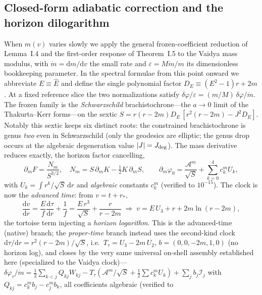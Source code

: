 \documentclass[12pt]{iopart}
\newcommand{\Ehat}{\hat E}
\newcommand{\dd}{\mathrm{d}}
\begin{document}
\subsection{Closed-form adiabatic correction and the horizon dilogarithm}
\label{sec:vaidya-adiabatic}
When $m(v)$ varies slowly we apply the general frozen-coefficient reduction of
Lemma~I.4 and the first-order response of Theorem~I.5 to the Vaidya mass modulus, with
$\dot m=\dd m/\dd v$ the small rate and $\varepsilon=M\dot m/m$ its dimensionless
bookkeeping parameter. In the spectral formulae from this point onward we abbreviate
$E\equiv\Ehat$ and define the single polynomial factor
$D_E\equiv(E^2-1)r+2m$. At a fixed reference slice the two normalizations satisfy
$\delta\varphi/\varepsilon=(m/M)\,\delta\varphi/\dot m$. The frozen family
is the \emph{Schwarzschild} brachistochrone---the $a\to0$ limit of the
Thakurta--Kerr forms---on the sextic
$S=r(r-2m)D_E\,[r^2(r-2m)-J^2 D_E]$. Notably this sextic keeps six
distinct roots: the constrained brachistochrone is genus \emph{two} even in
Schwarzschild (only the geodesics are elliptic; the genus drop occurs at the algebraic
degeneration value $|J|=J_{\rm deg}$). The mass derivative reduces exactly, the horizon factor cancelling,
\begin{equation}
    \partial_m F=\frac{N_m}{S^{3/2}},\quad N_m=S\,\partial_m K-\tfrac12 K\,\partial_m S,
    \qquad
    \partial_m\varphi_0=\frac{\mathcal{A}^m}{\sqrt S}+\sum_{k=0}^4 c_k^m U_k,
    \label{eq:dm-reduction}
\end{equation}
with $U_k=\int r^k/\sqrt S\,\dd r$ and \emph{algebraic} constants $c_k^m$ (verified
to $10^{-15}$). The clock is now the \emph{advanced time}: from $v=t+r_*$,
\begin{equation}
    \frac{\dd v}{\dd r}=\frac{E}{f}\frac{\dd\tau}{\dd r}+\frac1f
    =\frac{E\,r^3}{\sqrt S}+\frac{r}{r-2m}
    \;\Rightarrow\;
    v=E\,U_3+r+2m\ln(r-2m),
    \label{eq:vaidya-clock}
\end{equation}
the tortoise term injecting a \emph{horizon logarithm}. This is the advanced-time
(native) branch; the \emph{proper-time} branch instead uses the second-kind clock
$\dd\tau/\dd r=r^2(r-2m)/\sqrt S$, i.e.\ $T_\tau=U_3-2m\,U_2$, $b=(0,0,-2m,1,0)$ (no
horizon log), and closes by the very same
universal on-shell assembly established here (specialized to the Vaidya clock)---$\delta\varphi_\tau/\dot m=\tfrac12\sum_{k<j}Q_{kj}
W_{kj}-T_\tau(\mathcal{A}^m/\sqrt S+\tfrac12\sum c_k^m U_k)+\sum_j b_j\mathcal{I}_j$ with
$Q_{kj}=c_k^m b_j-c_j^m b_k$, all coefficients algebraic (verified to
\end{document}
